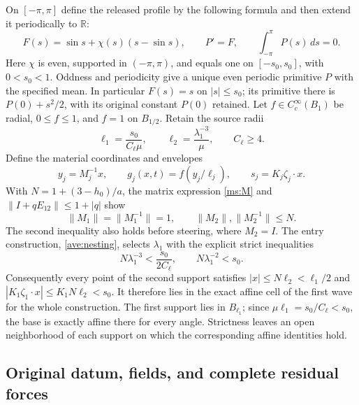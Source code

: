 On $[-\pi,\pi]$ define the released profile by the following formula
and then extend it periodically to $\mathbb R$:
\[
 F(s)=\sin s+\chi(s)(s-\sin s),\qquad
 P'=F,\qquad\int_{-\pi}^{\pi}P(s)\,ds=0.
\]
Here $\chi$ is even, supported in $(-\pi,\pi)$, and equals one
on $[-s_0,s_0]$, with $0<s_0<1$. Oddness and periodicity give
a unique even periodic primitive $P$ with the specified mean.
In particular $F(s)=s$ on $|s|\leq s_0$; its primitive there is
$P(0)+s^2/2$, with its original constant $P(0)$ retained.
Let $f\in C_c^\infty(B_1)$ be radial, $0\leq f\leq1$,
and $f=1$ on $B_{1/2}$. Retain the source radii
\[
 \ell_1=\frac{s_0}{C_\ell\mu},\qquad
 \ell_2=\frac{\lambda_1^{-3}}\mu,\qquad C_\ell\geq4.
\]
Define the material coordinates and envelopes
\[
 y_j=M_j^{-1}x,\qquad g_j(x,t)=f(y_j/\ell_j),\qquad
 s_j=K_j\zeta_j\cdot x.
\]
With $N=1+(3-h_0)/a$, the matrix expression \eqref{ms:M}
and $\|I+qE_{12}\|\leq1+|q|$ show
\begin{equation}\label{ms:N}
 \|M_1\|=\|M_1^{-1}\|=1,
 \qquad\|M_2\|,\|M_2^{-1}\|\leq N.
\end{equation}
The second inequality also holds before steering, where $M_2=I$.
The entry construction, \eqref{ave:nesting}, selects $\lambda_1$ with the explicit strict
inequalities
\begin{equation}\label{ms:nesting}
 N\lambda_1^{-3}<\frac{s_0}{2C_\ell},
 \qquad N\lambda_1^{-2}<s_0.
\end{equation}
Consequently every point of the second support satisfies
$|x|\leq N\ell_2<\ell_1/2$ and
$|K_1\zeta_1\cdot x|\leq K_1N\ell_2<s_0$.
It therefore lies in the exact affine cell of the first wave for
the whole construction. The first support lies in $B_{\ell_1}$;
since $\mu\ell_1=s_0/C_\ell<s_0$, the base is exactly affine
there for every angle. Strictness leaves an open neighborhood of
each support on which the corresponding affine identities hold.

\subsection{Original datum, fields, and complete residual forces}

